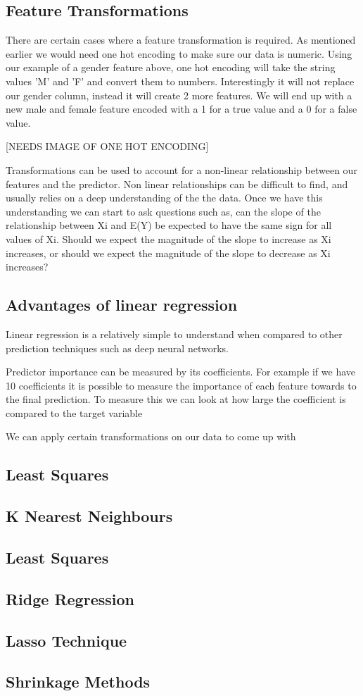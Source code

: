 \subsection*{Feature Transformations}

There are certain cases where a feature transformation is required. As mentioned earlier we would need one hot encoding to make sure our data is numeric. Using our example of a gender feature above, one hot encoding will take the string values 'M' and 'F' and convert them to numbers. Interestingly it will not replace our gender column, instead it will create 2 more features. We will end up with a new male and female feature encoded with a 1 for a true value and a 0 for a false value.

[NEEDS IMAGE OF ONE HOT ENCODING]

Transformations can be used to account for a non-linear relationship between our features and the predictor. Non linear relationships can be difficult to find, and usually relies on a deep understanding of the the data. Once we have this understanding we can start to ask questions such as, can the slope of
the relationship between Xi and E(Y) be expected to have the same sign for all values of Xi. Should we expect the magnitude of the slope to increase as Xi increases, or should we expect
the magnitude of the slope to decrease as Xi increases?\cite{7508191}

\subsection*{Advantages of linear regression}

Linear regression is a relatively simple to understand when compared to other prediction techniques such as deep neural networks.

Predictor importance can be measured by its coefficients. For example if we have 10 coefficients it is possible to measure the importance of each feature towards to the final prediction. To measure this we can look at how large the coefficient is compared to the target variable

We can apply certain transformations on our data to come up with 


\subsection*{Least Squares}
\subsection*{K Nearest Neighbours}
\subsection*{Least Squares}
\subsection*{Ridge Regression}
\subsection*{Lasso Technique}

\subsection*{Shrinkage Methods}